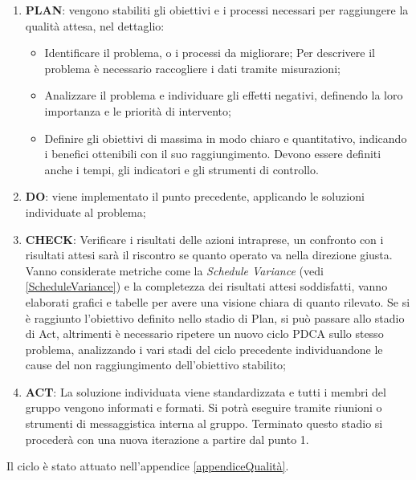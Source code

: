 	\begin{enumerate}
		\item \textbf{PLAN}: vengono stabiliti gli obiettivi e i processi necessari per raggiungere la qualità attesa, nel dettaglio:
		\begin{itemize}
			\item Identificare il problema, o i processi da migliorare; Per descrivere il problema è necessario raccogliere i dati tramite misurazioni;
			\item Analizzare il problema e individuare gli effetti negativi, definendo la loro importanza e le priorità di intervento;
			\item Definire gli obiettivi di massima in modo chiaro e quantitativo, indicando i benefici ottenibili con il suo raggiungimento. Devono essere definiti anche i tempi, gli indicatori e gli strumenti di controllo.
		\end{itemize}				
		\item \textbf{DO}: viene implementato il punto precedente, applicando le soluzioni individuate al problema;
		\item \textbf{CHECK}: Verificare i risultati delle azioni intraprese, un confronto con i risultati attesi sarà il riscontro se quanto operato va nella direzione giusta. Vanno considerate metriche come la \emph{Schedule Variance} (vedi \ref{ScheduleVariance}) e la completezza dei risultati attesi soddisfatti, vanno elaborati grafici e tabelle per avere una visione chiara di quanto rilevato. 
		Se si è raggiunto l'obiettivo definito nello stadio di Plan, si può passare allo stadio di Act, altrimenti è necessario ripetere un nuovo ciclo PDCA sullo stesso problema, analizzando i vari stadi del ciclo precedente individuandone le cause del non raggiungimento dell'obiettivo stabilito;
		\item \textbf{ACT}: La soluzione individuata viene standardizzata  e tutti i membri del gruppo vengono informati e formati. Si potrà eseguire tramite riunioni o strumenti di messaggistica interna al gruppo. Terminato questo stadio si procederà con una nuova iterazione a partire dal punto 1.
	\end{enumerate}

Il ciclo  è stato attuato nell'appendice \ref{appendiceQualità}. 

